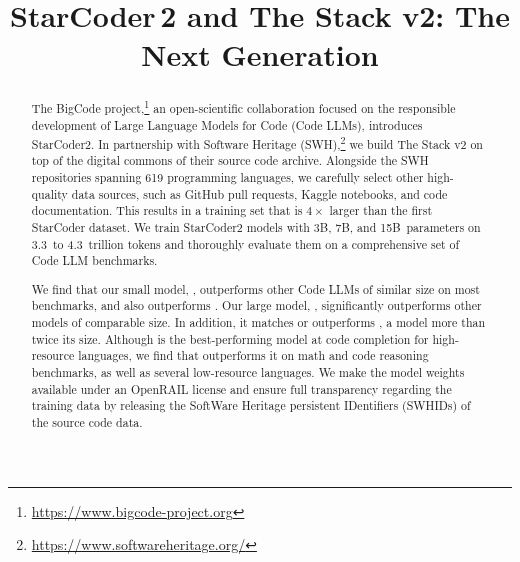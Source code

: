 \documentclass[10pt]{article} %
\title{\emojidizzy StarCoder\,2 and The Stack v2: The Next Generation}
\begin{document}
\maketitle
\vspace{-1.2cm}


\begin{abstract}
The BigCode project,\footnote{\url{https://www.bigcode-project.org}} an open-scientific collaboration focused on the responsible development of Large Language Models for Code (Code LLMs), introduces StarCoder2. In partnership with Software Heritage (SWH),\footnote{\url{https://www.softwareheritage.org/}} we build The Stack v2 on top of the digital commons of their source code archive. Alongside the SWH repositories spanning 619 programming languages, we carefully select other high-quality data sources, such as GitHub pull requests, Kaggle notebooks, and code documentation. This results in a training set that is $4\times$ larger than the first StarCoder dataset. We train StarCoder2 models with 3B, 7B, and 15B~parameters on 3.3~to 4.3~trillion tokens and thoroughly evaluate them on a comprehensive set of Code LLM benchmarks.

We find that our small model, , outperforms other Code LLMs of similar size on most benchmarks, and also outperforms . Our large model, , significantly outperforms other models of comparable size. In addition, it matches or outperforms , a model more than twice its size. Although  is the best-performing model at code completion for high-resource languages, we find that  outperforms it on math and code reasoning benchmarks, as well as several low-resource languages. We make the model weights available under an OpenRAIL license and ensure full transparency regarding the training data by releasing the SoftWare Heritage persistent IDentifiers (SWHIDs) of the source code data.  
\end{abstract}
\end{document}
